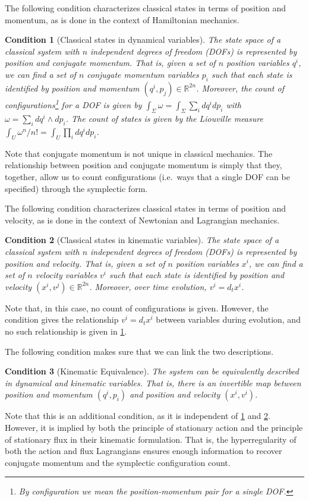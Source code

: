 \documentclass[nofootinbib,aps,pre]{revtex4-2}
\newtheorem{condth}{Condition}
\renewcommand*{\thecondth}{\Roman{condth}}
\newenvironment{condition}[2][]{\renewcommand{\thecondth}{#2}\begin{condth}[#1]\label{#2}}{\end{condth}\renewcommand{\thecondth}{\Roman{condth}}}
\begin{document}
The following condition characterizes classical states in terms of position and momentum, as is done in the context of Hamiltonian mechanics.
\begin{condition}[Classical states in dynamical variables]{CSD}
	The state space of a classical system with $n$ independent degrees of freedom (DOFs) is represented by position and conjugate momentum. That is, given a set of $n$ position variables $q^i$, we can find a set of $n$ conjugate momentum variables $p_i$ such that each state is identified by position and momentum $(q^i,p_j) \in \mathbb{R}^{2n}$. Moreover, the count of configurations\footnote{By \emph{configuration} we mean the position-momentum pair for a single DOF.} for a DOF is given by $\int_{\Sigma} \omega = \int_{\Sigma} \sum_i dq^i dp_i$ with $\omega = \sum_i dq^i \wedge dp_i$. The count of states is given by the Liouville measure $\int_U \omega^n / n! = \int_U \prod_i dq^i dp_i$. 
\end{condition}
Note that conjugate momentum is not unique in classical mechanics. The relationship between position and conjugate momentum is simply that they, together, allow us to count configurations (i.e.~ways that a single DOF can be specified) through the symplectic form.

The following condition characterizes classical states in terms of position and velocity, as is done in the context of Newtonian and Lagrangian mechanics.
\begin{condition}[Classical states in kinematic variables]{CSK}
	The state \linebreak space of a classical system with $n$ independent degrees of freedom (DOFs) is represented by position and velocity. That is, given a set of $n$ position variables $x^i$, we can find a set of $n$ velocity variables $v^i$ such that each state is identified by position and velocity $(x^i,v^j) \in \mathbb{R}^{2n}$. Moreover, over time evolution, $v^i = d_t x^i$.
\end{condition}
Note that, in this case, no count of configurations is given. However, the condition gives the relationship $v^i = d_t x^i$ between variables during evolution, and no such relationship is given in \ref{CSD}.

The following condition makes sure that we can link the two descriptions.
\begin{condition}[Kinematic Equivalence]{KE}
	The system can be equivalently described in dynamical and kinematic variables. That is, there is an invertible map between position and momentum $(q^i, p_i)$ and position and velocity $(x^i, v^i)$.
\end{condition}
Note that this is an additional condition, as it is independent of \ref{CSD} and \ref{CSK}. However, it is implied by both the principle of stationary action and the principle of stationary flux in their kinematic formulation. That is, the hyperregularity of both the action and flux Lagrangians ensures enough information to recover conjugate momentum and the symplectic configuration count.
\end{document}
